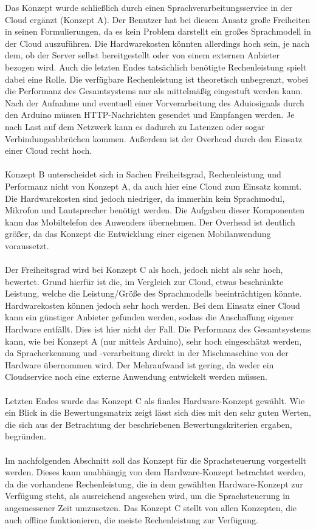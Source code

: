 Das Konzept wurde schließlich durch einen Sprachverarbeitungsservice in der Cloud ergänzt (Konzept A).
Der Benutzer hat bei diesem Ansatz große Freiheiten in seinen Formulierungen, da es kein Problem darstellt ein großes Sprachmodell in der Cloud auszuführen.
Die Hardwarekosten könnten allerdings hoch sein, je nach dem, ob der Server selbst bereitgestellt oder von einem externen Anbieter bezogen wird.
Auch die letzten Endes tatsächlich benötigte Rechenleistung spielt dabei eine Rolle.
Die verfügbare Rechenleistung ist theoretisch unbegrenzt, wobei die Performanz des Gesamtsystems nur als mittelmäßig eingestuft werden kann.
Nach der Aufnahme und eventuell einer Vorverarbeitung des Aduiosignals durch den Arduino müssen \ac{HTTP}-Nachrichten gesendet und Empfangen werden.
Je nach Last auf dem Netzwerk kann es dadurch zu Latenzen oder sogar Verbindungsabbrüchen kommen.
Außerdem ist der Overhead durch den Einsatz einer Cloud recht hoch.\\\\
Konzept B unterscheidet sich in Sachen Freiheitsgrad, Rechenleistung und Performanz nicht von Konzept A, da auch hier eine Cloud zum Einsatz kommt.
Die Hardwarekosten sind jedoch niedriger, da immerhin kein Sprachmodul, Mikrofon und Lautsprecher benötigt werden.
Die Aufgaben dieser Komponenten kann das Mobiltelefon des Anwenders übernehmen.
Der Overhead ist deutlich größer, da das Konzept die Entwicklung einer eigenen Mobilanwendung voraussetzt.\\\\
Der Freiheitsgrad wird bei Konzept C als hoch, jedoch nicht als sehr hoch, bewertet.
Grund hierfür ist die, im Vergleich zur Cloud, etwas beschränkte Leistung, welche die Leistung/Größe des Sprachmodells beeinträchtigen könnte.
Hardwarekosten können jedoch sehr hoch werden.
Bei dem Einsatz einer Cloud kann ein günstiger Anbieter gefunden werden, sodass die Anschaffung eigener Hardware entfällt.
Dies ist hier nicht der Fall.
Die Performanz des Gesamtsystems kann, wie bei Konzept A (nur mittels Arduino), sehr hoch eingeschätzt werden, da Spracherkennung und -verarbeitung direkt in der Mischmaschine von der Hardware übernommen wird.
Der Mehraufwand ist gering, da weder ein Cloudservice noch eine externe Anwendung entwickelt werden müssen.\\\\
Letzten Endes wurde das Konzept C als finales Hardware-Konzept gewählt. Wie ein Blick in die Bewertungsmatrix zeigt lässt sich dies mit den sehr guten Werten, die sich aus der Betrachtung der beschriebenen Bewertungskriterien ergaben, begründen.\\\\
Im nachfolgenden Abschnitt soll das Konzept für die Sprachsteuerung vorgestellt werden. Dieses kann unabhängig von dem Hardware-Konzept betrachtet werden, da die vorhandene Rechenleistung, die in dem gewählten Hardware-Konzept zur Verfügung steht, als ausreichend angesehen wird, um die Sprachsteuerung in angemessener Zeit umzusetzen. Das Konzept C stellt von allen Konzepten, die auch offline funktionieren, die meiste Rechenleistung zur Verfügung.

